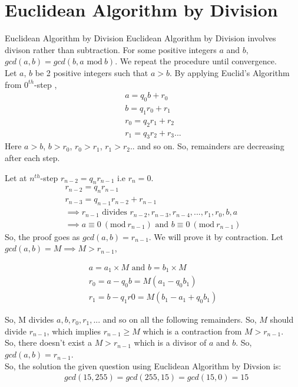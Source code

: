 \documentclass[8pt]{beamer}
\begin{document}
\section{Euclidean Algorithm by Division}
\begin{frame}[allowframebreaks]{Euclidean Algorithm by Division}
Euclidean Algorithm by Division involves divison rather than subtraction. For some positive integers $a$ and $b$, $gcd(a, b) = gcd(b, a \textrm{ mod}\ b)$. We repeat the procedure until convergence.\\

 Let $a$, $b$ be 2 positive integers such that $a > b$. By applying Euclid's Algorithm from $0^{th}$-step ,
 \begin{align}
     a = q_{0}b + r_{0}\label{eq:ED1}\\
     b = q_{1}r_{0} + r_{1}\\
     r_{0} = q_{2}r_{1} + r_{2}\\
     r_{1} = q_{3}r_{2} + r_{3}...
 \end{align}
 Here $a > b$, $ b > r_{0}$, $r_{0} > r_{1}$, $r_{1} > r_{2}$.. and so on. So, remainders are decreasing after each step.
 
 \framebreak
 
 Let at $n^{th}$-step $r_{n-2} = q_{n}r_{n-1}$ i.e $r_{n} = 0$.
 \begin{align}
    r_{n-2} = q_{n}r_{n-1}\label{eq:ED2}\\
    r_{n-3} = q_{n-1}r_{n-2} + r_{n-1}\\
    \implies r_{n-1} \text{ divides } r_{n-2}, r_{n-3}, r_{n-4},..., r_{1}, r_{0}, b, a\\
    \implies a \equiv 0\ (\textrm{mod}\ r_{n-1}) \text{ and } b \equiv 0\ (\textrm{mod}\ r_{n-1})
\end{align}
So, the proof goes as $gcd(a,b) = r_{n-1}$. We will prove it by contraction. Let  $gcd(a,b) = M \implies M > r_{n-1}$,

\begin{align}
    a = a_{1} \times M \text{ and } b = b_{1} \times M\\
    r_{0} = a - q_{0}b = M(a_{1} - q_{0}b_{1})\\
    r_{1} = b - q_{1}r{0} = M(b_{1} - a_{1} + q_{0}b_{1})
\end{align}

\framebreak

So, M divides $a, b, r_{0}, r_{1}, ... $ and so on all the following remainders. So, $M$ should divide $r_{n-1}$, which implies $r_{n-1} \geq M$ which is a contraction from $M > r_{n-1}$.\\
\vspace{0.2in}
So, there doesn't exist a $M > r_{n-1}$ which is a divisor of $a$ and $b$. So, $gcd(a,b)  = r_{n-1}$.\\
\vspace{0.2in}
So, the solution the given question using Euclidean Algorithm by Divsion is:
\[
\begin{split}
&gcd(15,255) = gcd(255,15) = gcd(15,0) = 15
\end{split}\]

\end{frame}
\end{document}
